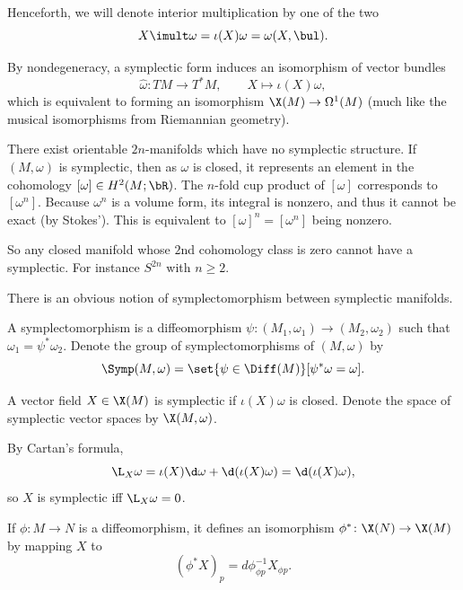 \eexam

\bnote

    Henceforth, we will denote interior multiplication by one of the two
    $$ X\imult\omega = \iota(X)\omega = \omega(X,\bul) . $$

\enote

By nondegeneracy, a symplectic form induces an isomorphism of vector bundles
$$ \hat\omega\colon TM\to T^*M,\qquad X\mapsto\iota(X)\omega , $$
which is equivalent to forming an isomorphism $\X(M)\to\Omega^1(M)$ (much like the musical isomorphisms from Riemannian geometry).

\bexam

    There exist orientable $2n$-manifolds which have no symplectic structure.
    If $(M,\omega)$ is symplectic, then as $\omega$ is closed, it represents an element in the cohomology $[\omega]\in H^2(M;\bR)$.
    The $n$-fold cup product of $[\omega]$ corresponds to $[\omega^n]$.
    Because $\omega^n$ is a volume form, its integral is nonzero, and thus it cannot be exact (by Stokes').
    This is equivalent to $[\omega]^n=[\omega^n]$ being nonzero.

    So any closed manifold whose $2$nd cohomology class is zero cannot have a symplectic.
    For instance $S^{2n}$ with $n\geq2$.

\eexam

There is an obvious notion of symplectomorphism between symplectic manifolds.

\bdefn

    A {\emphcolor symplectomorphism} is a diffeomorphism $\psi\colon(M_1,\omega_1)\to(M_2,\omega_2)$ such that $\omega_1=\psi^*\omega_2$.
    Denote the group of symplectomorphisms of $(M,\omega)$ by
    $$ \Symp(M,\omega) = \set{\psi\in\Diff(M)}[\psi^*\omega=\omega] . $$

\edefn

\bdefn

    A vector field $X\in\X(M)$ is {\emphcolor symplectic} if $\iota(X)\omega$ is closed.
    Denote the space of symplectic vector spaces by $\X(M,\omega)$.

\edefn

By Cartan's formula,
$$ \L_X\omega = \iota(X)\d\omega + \d(\iota(X)\omega) = \d(\iota(X)\omega) , $$
so $X$ is symplectic iff $\L_X\omega=0$.

If $\phi\colon M\to N$ is a diffeomorphism, it defines an isomorphism $\phi^*\colon\X(N)\to\X(M)$ by mapping $X$ to
$$ (\phi^*X)_p = d\phi^{-1}_{\phi p}X_{\phi p} . $$

